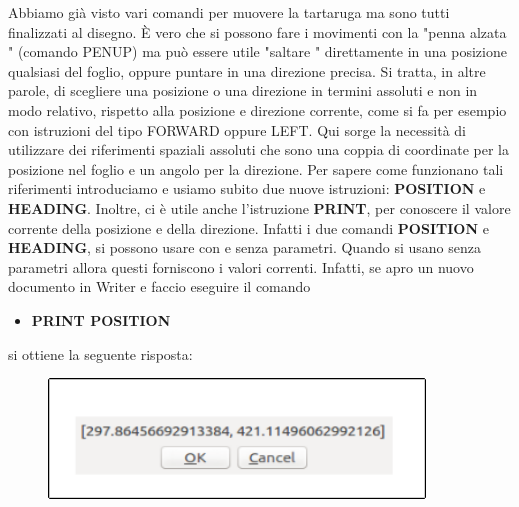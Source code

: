 Abbiamo già visto vari comandi per muovere la tartaruga ma sono tutti finalizzati al disegno. È vero che si possono fare i movimenti con la  "penna alzata " (comando PENUP) ma può essere utile  "saltare " direttamente in una posizione qualsiasi del foglio, oppure puntare in una direzione precisa.  Si tratta, in altre parole, di scegliere una posizione o una direzione in termini assoluti e non in modo relativo, rispetto alla posizione e direzione corrente, come si fa per esempio con istruzioni del tipo FORWARD oppure LEFT. Qui sorge la necessità di utilizzare dei  riferimenti spaziali assoluti che sono una coppia di coordinate per la posizione nel foglio e un angolo per la direzione. Per sapere come funzionano tali riferimenti introduciamo e usiamo subito due nuove istruzioni: \textbf{POSITION}  e \textbf{HEADING}. Inoltre, ci è utile anche l'istruzione \textbf{PRINT}, per conoscere il valore corrente della posizione e della direzione. Infatti i due comandi \textbf{POSITION} e \textbf{HEADING}, si possono usare con e senza parametri. Quando si usano senza parametri allora questi forniscono i valori correnti. Infatti, se apro un nuovo documento in Writer e faccio eseguire il comando

\vskip 1cm

\begin{scriptsize}
\begin{minipage}{1.0\textwidth}
\begin{itemize}[itemsep=-3pt,parsep=2pt]
\item[] \textbf{PRINT POSITION}
\end{itemize}
\end{minipage}
\end{scriptsize}

\vskip 1cm

si ottiene la seguente risposta:

\vskip 1cm

\begin{figure}[H]
   \centering
   \includegraphics[width=10.0cm,trim=8 8 8 8,clip]{./images/disegnare/disegnare-28.png}
   \label{dis-28}
\end{figure}

\vskip 1cm

